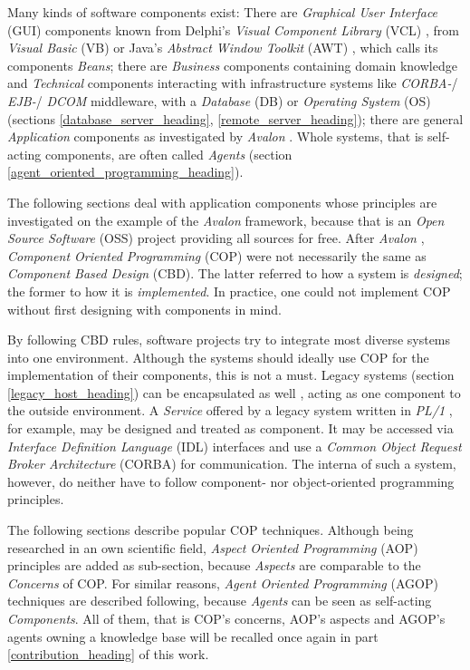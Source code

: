 Many kinds of software components exist: There are \emph{Graphical User Interface}
(GUI) components known from Delphi's \emph{Visual Component Library} (VCL)
\cite{delphi}, from \emph{Visual Basic} (VB) \cite{visualbasic} or Java's
\emph{Abstract Window Toolkit} (AWT) \cite{java}, which calls its components
\emph{Beans}; there are \emph{Business} components containing domain knowledge
and \emph{Technical} components interacting with infrastructure systems like
\emph{CORBA-}/ \emph{EJB-}/ \emph{DCOM} middleware, with a \emph{Database} (DB)
or \emph{Operating System} (OS) (sections \ref{database_server_heading},
\ref{remote_server_heading}); there are general \emph{Application} components
as investigated by \emph{Avalon} \cite{avalon}. Whole systems, that is
self-acting components, are often called \emph{Agents} (section
\ref{agent_oriented_programming_heading}).

The following sections deal with application components whose principles are
investigated on the example of the \emph{Avalon} framework, because that is an
\emph{Open Source Software} (OSS) project providing all sources for free. After
\emph{Avalon} \cite{avalon}, \emph{Component Oriented Programming} (COP) were
not necessarily the same as \emph{Component Based Design} (CBD). The latter
referred to how a system is \emph{designed}; the former to how it is
\emph{implemented}. In practice, one could not implement COP without first
designing with components in mind.

By following CBD rules, software projects try to integrate most diverse systems
into one environment. Although the systems should ideally use COP for the
implementation of their components, this is not a must. Legacy systems (section
\ref{legacy_host_heading}) can be encapsulated as well \cite{brown2000}, acting
as one component to the outside environment. A \emph{Service} offered by a legacy
system written in \emph{PL/1} \cite{pli}, for example, may be designed and
treated as component. It may be accessed via \emph{Interface Definition Language}
(IDL) interfaces and use a \emph{Common Object Request Broker Architecture}
(CORBA) for communication. The interna of such a system, however, do neither
have to follow component- nor object-oriented programming principles.

The following sections describe popular COP techniques. Although being
researched in an own scientific field, \emph{Aspect Oriented Programming} (AOP)
principles are added as sub-section, because \emph{Aspects} are comparable to
the \emph{Concerns} of COP. For similar reasons, \emph{Agent Oriented Programming}
(AGOP) techniques are described following, because \emph{Agents} can be seen as
self-acting \emph{Components}. All of them, that is COP's concerns, AOP's
aspects and AGOP's agents owning a knowledge base will be recalled once again
in part \ref{contribution_heading} of this work.








